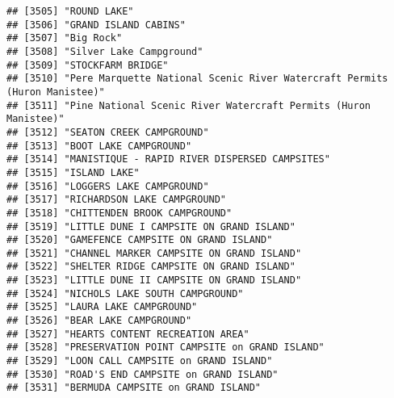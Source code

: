 \documentclass[
]{article}
\begin{document}
\begin{verbatim}
## [3505] "ROUND LAKE"                                                                          
## [3506] "GRAND ISLAND CABINS"                                                                 
## [3507] "Big Rock"                                                                            
## [3508] "Silver Lake Campground"                                                              
## [3509] "STOCKFARM BRIDGE"                                                                    
## [3510] "Pere Marquette National Scenic River Watercraft Permits (Huron Manistee)"            
## [3511] "Pine National Scenic River Watercraft Permits (Huron Manistee)"                      
## [3512] "SEATON CREEK CAMPGROUND"                                                             
## [3513] "BOOT LAKE CAMPGROUND"                                                                
## [3514] "MANISTIQUE - RAPID RIVER DISPERSED CAMPSITES"                                        
## [3515] "ISLAND LAKE"                                                                         
## [3516] "LOGGERS LAKE CAMPGROUND"                                                             
## [3517] "RICHARDSON LAKE CAMPGROUND"                                                          
## [3518] "CHITTENDEN BROOK CAMPGROUND"                                                         
## [3519] "LITTLE DUNE I CAMPSITE ON GRAND ISLAND"                                              
## [3520] "GAMEFENCE CAMPSITE ON GRAND ISLAND"                                                  
## [3521] "CHANNEL MARKER CAMPSITE ON GRAND ISLAND"                                             
## [3522] "SHELTER RIDGE CAMPSITE ON GRAND ISLAND"                                              
## [3523] "LITTLE DUNE II CAMPSITE ON GRAND ISLAND"                                             
## [3524] "NICHOLS LAKE SOUTH CAMPGROUND"                                                       
## [3525] "LAURA LAKE CAMPGROUND"                                                               
## [3526] "BEAR LAKE CAMPGROUND"                                                                
## [3527] "HEARTS CONTENT RECREATION AREA"                                                      
## [3528] "PRESERVATION POINT CAMPSITE on GRAND ISLAND"                                         
## [3529] "LOON CALL CAMPSITE on GRAND ISLAND"                                                  
## [3530] "ROAD'S END CAMPSITE on GRAND ISLAND"                                                 
## [3531] "BERMUDA CAMPSITE on GRAND ISLAND"                                                    

\end{verbatim}
\end{document}
